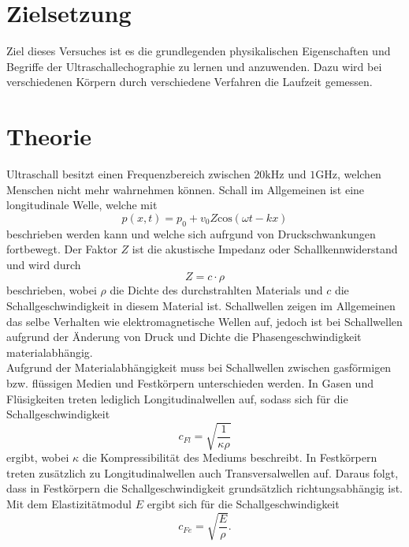 \section{Zielsetzung}
\label{sec:Zielsetzung}
Ziel dieses Versuches ist es die grundlegenden physikalischen Eigenschaften und Begriffe der Ultraschallechographie zu lernen und anzuwenden. 
Dazu wird bei verschiedenen Körpern durch verschiedene Verfahren die Laufzeit gemessen.

\section{Theorie}
\label{sec:Theorie}
Ultraschall besitzt einen Frequenzbereich zwischen $20 \si{\kilo\Hz}$ und $1 \si{\giga\Hz}$, welchen Menschen nicht mehr wahrnehmen können.
Schall im Allgemeinen ist eine longitudinale Welle, welche mit 
\begin{equation*}
    p(x,t) = p_0 + v_0 Z \text{cos}(\omega t - k x)
\end{equation*}
beschrieben werden kann und welche sich aufrgund von Druckschwankungen fortbewegt.
Der Faktor $Z$ ist die akustische Impedanz oder Schallkennwiderstand und wird durch
\begin{equation}
    Z = c \cdot \rho 
    \label{eqn:Impedanz}
\end{equation}
beschrieben, wobei $\rho$ die Dichte des durchstrahlten Materials und $c$ die Schallgeschwindigkeit in diesem Material ist.
Schallwellen zeigen im Allgemeinen das selbe Verhalten wie elektromagnetische Wellen
auf, jedoch ist bei Schallwellen aufgrund der Änderung von Druck und Dichte die
Phasengeschwindigkeit materialabhängig.\\
Aufgrund der Materialabhängigkeit muss bei Schallwellen zwischen gasförmigen bzw. flüssigen Medien und Festkörpern unterschieden werden.
In Gasen und Flüsigkeiten treten lediglich Longitudinalwellen auf, sodass sich für die Schallgeschwindigkeit
\begin{equation}
    c_{Fl} = \sqrt{\frac{1}{\kappa \rho}}
    \label{eqn:cFlüssig}
\end{equation}
ergibt, wobei $\kappa$ die Kompressibilität des Mediums beschreibt.
In Festkörpern treten zusätzlich zu Longitudinalwellen auch Transversalwellen auf. Daraus folgt, dass in Festkörpern die Schallgeschwindigkeit 
grundsätzlich richtungsabhängig ist.
Mit dem Elastizitätmodul $E$ ergibt sich für die Schallgeschwindigkeit
\begin{equation}
    c_{Fe} = \sqrt{\frac{E}{\rho}}.
    \label{eqn:cFest}
\end{equation}
